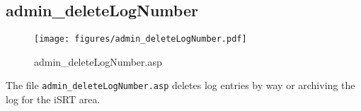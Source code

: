 \subsection{admin\_deleteLogNumber}
\begin{figure}[htb]
    \begin{center}
        \texttt{[image: figures/admin\_deleteLogNumber.pdf]}
    \end{center}
    \caption{admin\_deleteLogNumber.asp}
    \label{fig:admin_deleteLogNumber}
\end{figure}

The file \verb|admin_deleteLogNumber.asp| deletes log entries by way or
archiving the log for the iSRT area.
